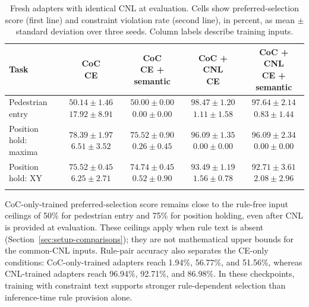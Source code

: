 \begin{table}[tbp]
\caption{Fresh adapters with identical CNL at evaluation. Cells show preferred-selection score
(first line) and constraint violation rate (second line), in percent, as mean $\pm$
standard deviation over three seeds. Column labels describe training inputs.}
\label{tab:results-common-rule}
\centering\footnotesize
\setlength{\tabcolsep}{3pt}
\begin{tabularx}{\textwidth}{@{}>{\raggedright\arraybackslash}Xcccc@{}}
\toprule
Task & \shortstack{CoC\\CE} & \shortstack{CoC\\CE + semantic} &
\shortstack{CoC + CNL\\CE} & \shortstack{CoC + CNL\\CE + semantic}\\
\midrule
Pedestrian entry & \shortstack{$50.14\pm1.46$\\$17.92\pm8.91$} &
\shortstack{$50.00\pm0.00$\\$0.00\pm0.00$} &
\shortstack{$98.47\pm1.20$\\$1.11\pm1.58$} &
\shortstack{$97.64\pm2.14$\\$0.83\pm1.44$}\\[5pt]
Position hold: maxima & \shortstack{$78.39\pm1.97$\\$6.51\pm3.52$} &
\shortstack{$75.52\pm0.90$\\$0.26\pm0.45$} &
\shortstack{$96.09\pm1.35$\\$0.00\pm0.00$} &
\shortstack{$96.09\pm2.34$\\$0.00\pm0.00$}\\[5pt]
Position hold: XY & \shortstack{$75.52\pm0.45$\\$6.25\pm2.71$} &
\shortstack{$74.74\pm0.45$\\$0.52\pm0.90$} &
\shortstack{$93.49\pm1.19$\\$1.56\pm0.78$} &
\shortstack{$92.71\pm3.61$\\$2.08\pm2.96$}\\
\botrule
\end{tabularx}
\end{table}

CoC-only-trained preferred-selection score remains close to the rule-free input ceilings of
50\% for pedestrian entry and 75\% for position holding, even after CNL is
provided at evaluation. These ceilings apply when rule text is absent
(Section~\ref{sec:setup-comparisons}); they are not mathematical upper bounds
for the common-CNL inputs. Rule-pair accuracy also separates the CE-only
conditions: CoC-only-trained adapters reach 1.94\%, 56.77\%, and 51.56\%,
whereas CNL-trained adapters reach 96.94\%, 92.71\%, and 86.98\%. In these
checkpoints, training with constraint text supports stronger rule-dependent
selection than inference-time rule provision alone.

